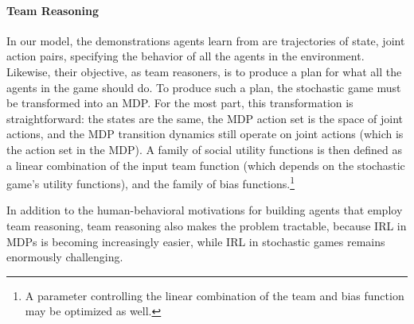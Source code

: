 
\vspace{\up}
\paragraph{Team Reasoning}

In our model, the demonstrations agents learn from are trajectories of
state, joint action pairs, specifying the behavior of all the agents in
the environment.  Likewise, their objective, as team reasoners, is to
produce a plan for what all the agents in the game should do.  To
produce such a plan, the stochastic game must be transformed into an
MDP.  For the most part, this transformation is straightforward: the
states are the same, the MDP action set is the space of joint actions,
and the MDP transition dynamics still operate on joint actions (which
is the action set in the MDP).  A family of social utility functions is
then defined as a linear combination of the input team function (which
depends on the stochastic game's utility functions), and the family of
bias functions.\footnote{A parameter controlling the linear
  combination of the team and bias function may be optimized as well.}

In addition to the human-behavioral motivations for building agents
that employ team reasoning, team reasoning also makes the problem
tractable, because IRL in MDPs is becoming increasingly easier, while
IRL in stochastic games remains enormously challenging.


